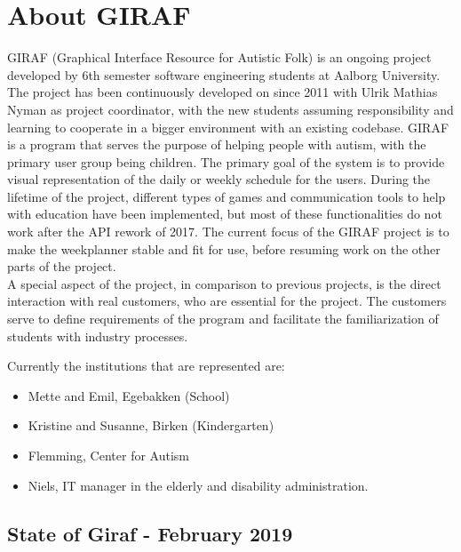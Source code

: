 \section{About GIRAF}
GIRAF (Graphical Interface Resource for Autistic Folk) is an ongoing project developed by 6th semester software engineering students at Aalborg University. 
The project has been continuously developed on since 2011 with Ulrik Mathias Nyman as project coordinator, with the new students assuming responsibility and learning to cooperate in a bigger environment with an existing codebase. 
GIRAF is a program that serves the purpose of helping people with autism, with the primary user group being children.
The primary goal of the system is to provide visual representation of the daily or weekly schedule for the users.
During the lifetime of the project, different types of games and communication tools to help with education have been implemented, but most of these functionalities do not work after the API rework of 2017. The current focus of the GIRAF project is to make the weekplanner stable and fit for use, before resuming work on the other parts of the project. 
\\
A special aspect of the project, in comparison to previous projects, is the direct interaction with real customers, who are essential for the project.
The customers serve to define requirements of the program and facilitate the familiarization of students with industry processes.

Currently the institutions that are represented are: 
\begin{itemize}
    \item Mette and Emil, Egebakken (School)
    \item Kristine and Susanne, Birken (Kindergarten)
    \item Flemming, Center for Autism
    \item Niels, IT manager in the elderly and disability administration.
\end{itemize}

\subsection{State of Giraf - February 2019}
